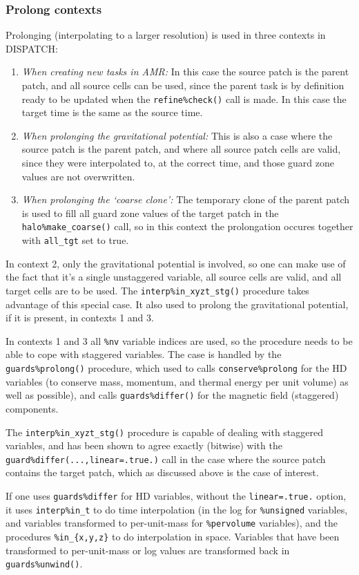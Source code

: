 \documentclass[paper=a4,fontsize=11pt]{scrartcl}
\numberwithin{equation}{section}		%
\numberwithin{figure}{section}			%
\numberwithin{table}{section}				%
\begin{document}
\subsubsection{Prolong contexts}
Prolonging (interpolating to a larger resolution) is used in three contexts in DISPATCH:
\begin{enumerate}
    \item \textit{When creating new tasks in AMR:}  In this case the source patch is the parent patch, and all source cells can be used, since the parent task is by definition ready to be updated when the \verb|refine%check()| call is made.  In this case the target time is the same as the source time.
    \item \textit{When prolonging the gravitational potential:} This is also a case where the source patch is the parent patch, and where all source patch cells are valid, since they were interpolated to, at the correct time, and those guard zone values are not overwritten.
    \item \textit{When prolonging the `coarse clone':} The temporary clone of the parent patch is used to fill all guard zone values of the target patch in the \verb|halo%make_coarse()| call, so in this context the prolongation occures together with \verb|all_tgt| set to true.
\end{enumerate}
In context 2, only the gravitational potential is involved, so one can make use of the fact that it's a single unstaggered variable, all source cells are valid, and all target cells are to be used.  The \verb|interp%in_xyzt_stg()| procedure takes advantage of this special case.  It also used to prolong the gravitational potential, if it is present, in contexts 1 and 3.

In contexts 1 and 3 all \verb|%nv| variable indices are used, so the procedure needs to be able to cope with staggered variables.  The case is handled by the  \verb|guards%prolong()| procedure, which used to calls \verb|conserve%prolong| for the HD variables (to conserve mass, momentum, and thermal energy per unit volume) as well as possible), and calls \verb|guards%differ()| for the magnetic field (staggered) components.

The \verb|interp%in_xyzt_stg()| procedure is capable of dealing with staggered variables, and has been shown to agree exactly (bitwise) with the \verb|guard%differ(...,linear=.true.)| call in the case where the source patch contains the target patch, which as discussed above is the case of interest.

If one uses \verb|guards%differ| for HD variables, without the \verb|linear=.true.| option, it uses \verb|interp%in_t| to do time interpolation (in the log for \verb|%unsigned| variables, and variables transformed to per-unit-mass for \verb|%pervolume| variables), and the procedures \verb|%in_{x,y,z}| to do interpolation in space.  Variables that have been transformed to per-unit-mass or log values are transformed back in \verb|guards%unwind()|.
\end{document}
